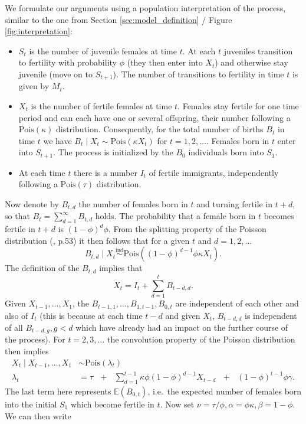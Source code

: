 \documentclass[10pt,a4paper]{article}
\begin{document}
We formulate our arguments using a population interpretation of the process, similar to the one from Section \ref{sec:model_definition} / Figure \ref{fig:interpretation}:
\begin{itemize}
\item $S_t$ is the number of juvenile females at time $t$. At each $t$ juveniles transition to fertility with probability $\phi$ (they then enter into $X_t$) and otherwise stay juvenile (move on to $S_{t + 1}$). The number of transitions to fertility in time $t$ is given by $M_t$.
\item $X_t$ is the number of fertile females at time $t$. Females stay fertile for one time period and can each have one or several offspring, their number following a $\text{Pois}(\kappa)$ distribution. Consequently, for the total number of births $B_t$ in time $t$ we have $B_t \mid X_t \sim \text{Pois}(\kappa X_t)$ for $t  =1, 2, \dots$. Females born in $t$ enter into $S_{t + 1}$. The process is initialized by the $B_0$ individuals born into $S_1$.
\item At each time $t$ there is a number $I_t$ of fertile immigrants, independently following a $\text{Pois}(\tau)$ distribution.
\end{itemize}
Now denote by $B_{t, d}$ the number of females born in $t$ and turning fertile in $t + d$, so that $B_t = \sum_{d = 1}^{\infty} B_{t, d}$ holds. The probability that a female born in $t$ becomes fertile in $t + d$ is $(1 - \phi)^d\phi$. From the splitting property of the Poisson distribution (\citealt{Kingman1993}, p.53) it then follows that for a given $t$ and $d = 1, 2, \dots$
$$
B_{t, d} \mid X_t \stackrel{\text{ind}}{\sim} \text{Pois}((1 - \phi)^{d - 1}\phi\kappa X_t).
$$
The definition of the $B_{t, d}$ implies that
$$
X_t = I_t + \sum_{d = 1}^{t} B_{t - d, d}.
$$
Given $X_{t - 1}, \dots, X_1$, the $B_{t - 1, 1},\dots, B_{1, t - 1}, B_{0, t}$ are independent of each other and also of $I_t$ (this is because at each time $t - d$ and given $X_t$, $B_{t - d, d}$ is independent of all $B_{t - d, g}, g < d$ which have already had an impact on the further course of the process). For $t = 2, 3, \dots$ the convolution property of the Poisson distribution then implies
\begin{align*}
X_ t \mid X_{t - 1}, \dots, X_1 & \sim \text{Pois}(\lambda_t)\\
\lambda_t & = \tau \ \ \ + \ \ \ \sum_{d = 1}^{t - 1} \kappa\phi(1 - \phi)^{d - 1}X_{t - d} \ \ \ + \ \ \ (1 - \phi)^{t - 1}\phi\gamma.
\end{align*}
The last term here represents $\mathbb{E}(B_{0, t})$, i.e.\ the expected number of females born into the initial $S_1$ which become fertile in $t$. Now set $\nu = \tau/\phi, \alpha = \phi\kappa, \beta = 1 - \phi$. We can then write
\end{document}
